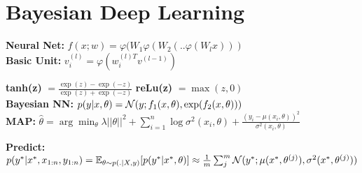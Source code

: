 \begin{comment}
	\pagebreak
\end{comment}

\section{Bayesian Deep Learning}
\begin{comment}
	We want to treat the weights of a neural network as distributions, for which we can define uncertainty as well.\\
\end{comment}
\textbf{Neural Net:} $f(x;w) = \varphi(W_1\varphi(W_2(..\varphi(W_l x)))$\\
\textbf{Basic Unit:} $v_i^{(l)} = \varphi(w_i^{(l)T} v^{(l-1)})$\\
\begin{comment}
	We want each unit to be differentiable, such that efficient computation graphs can be automatically created.\\
\end{comment}

\textbf{tanh(z)} $= \frac{\exp(z) - \exp(-z)}{\exp(z) + \exp(-z)}$
\textbf{reLu(z)} $= \max(z,0)$\\

\textbf{Bayesian NN:} $p(y | x,\theta) = \mathcal{N}(y; f_1(x, \theta), \exp(f_2(x, \theta)))$\\

\textbf{MAP:} $\hat{\theta} = \arg\min_\theta \lambda ||\theta||^2 + \sum_{i=1}^n \log \sigma^2(x_i,\theta) + \frac{(y_i-\mu(x_i, \theta))^2}{\sigma^2(x_i, \theta)}$\\
\begin{comment}
	Can be derived by plugging in the Bayesian NN likelihood and a standard Gaussian prior.\\
	\textbf{Intuition:} The model can be far of the mean and can still balance it out with increased variance. High variance is costly, though.\\
	The model has to balance out how it explains the data with mean and variance.\\
\end{comment}

\textbf{Predict:} $p(y^* | x^*, x_{1:n}, y_{1:n}) 
= \mathbb{E}_{\theta \sim p(.|X,y)} [p(y^*|x^*,\theta)] \\
\approx \frac{1}{m} \sum_j^m \mathcal{N}(y^*; \mu(x^*, \theta^{(j)}), \sigma^2(x^*, \theta^{(j)}))$\\
\begin{comment}
	We just parameterize all the means and variances with our NN. If we use the reparameterization trick, we follow along an use $C\epsilon + \mu$ as new $\theta$.\\
	For Gaussian likelihood, the prediction becomes a mixture of Gaussians.\\
\end{comment}

